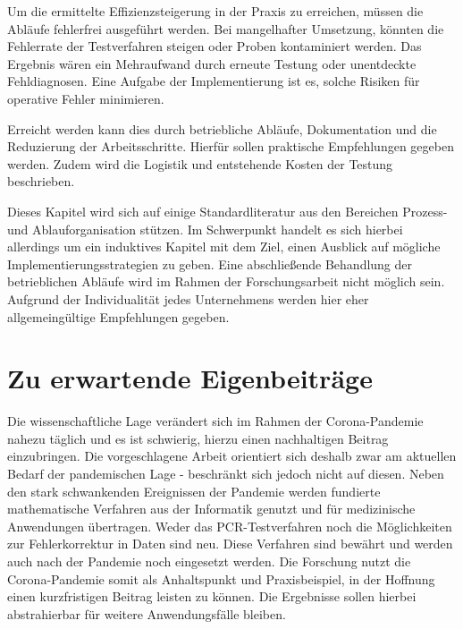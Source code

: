 Um die ermittelte Effizienzsteigerung in der Praxis zu erreichen, müssen die Abläufe fehlerfrei ausgeführt werden.
Bei mangelhafter Umsetzung, könnten die Fehlerrate der Testverfahren steigen oder Proben kontaminiert werden.
Das Ergebnis wären ein Mehraufwand durch erneute Testung oder unentdeckte Fehldiagnosen.
Eine Aufgabe der Implementierung ist es, solche Risiken für operative Fehler minimieren.

Erreicht werden kann dies durch betriebliche Abläufe, Dokumentation und die Reduzierung der Arbeitsschritte.
Hierfür sollen praktische Empfehlungen gegeben werden.
Zudem wird die Logistik und entstehende Kosten der Testung beschrieben.

Dieses Kapitel wird sich auf einige Standardliteratur aus den Bereichen Prozess- und Ablauforganisation stützen.
Im Schwerpunkt handelt es sich hierbei allerdings um ein induktives Kapitel mit dem Ziel, einen Ausblick auf mögliche Implementierungsstrategien zu geben.
Eine abschließende Behandlung der betrieblichen Abläufe wird im Rahmen der Forschungsarbeit nicht möglich sein.
Aufgrund der Individualität jedes Unternehmens werden hier eher allgemeingültige Empfehlungen gegeben.

\section{Zu erwartende Eigenbeiträge}
Die wissenschaftliche Lage verändert sich im Rahmen der Corona-Pandemie nahezu täglich und es ist schwierig, hierzu einen nachhaltigen Beitrag einzubringen.
Die vorgeschlagene Arbeit orientiert sich deshalb zwar am aktuellen Bedarf der pandemischen Lage - beschränkt sich jedoch nicht auf diesen.
Neben den stark schwankenden Ereignissen der Pandemie werden fundierte mathematische Verfahren aus der Informatik genutzt und für medizinische Anwendungen übertragen.
Weder das PCR-Testverfahren noch die Möglichkeiten zur Fehlerkorrektur in Daten sind neu.
Diese Verfahren sind bewährt und werden auch nach der Pandemie noch eingesetzt werden.
Die Forschung nutzt die Corona-Pandemie somit als Anhaltspunkt und Praxisbeispiel, in der Hoffnung einen kurzfristigen Beitrag leisten zu können.
Die Ergebnisse sollen hierbei abstrahierbar für weitere Anwendungsfälle bleiben.